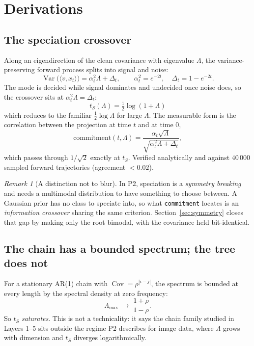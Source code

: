 \documentclass[11pt]{article}
\theoremstyle{remark}
\newtheorem{remark}{Remark}
\newcommand{\Var}{\operatorname{Var}}
\newcommand{\Cov}{\operatorname{Cov}}
\newcommand{\code}[1]{\texttt{\small #1}}
\begin{document}
\section{Derivations}
\label{sec:theory}

\subsection{The speciation crossover}
\label{sec:speciation}

Along an eigendirection of the clean covariance with eigenvalue $\Lambda$, the
variance-preserving forward process splits into signal and noise:
\begin{equation}
  \Var\bigl(\langle v, x_t\rangle\bigr) = \alpha_t^2\Lambda + \Delta_t,
  \qquad \alpha_t^2 = e^{-2t},\quad \Delta_t = 1-e^{-2t}.
\end{equation}
The mode is decided while signal dominates and undecided once noise does, so the
crossover sits at $\alpha_t^2\Lambda = \Delta_t$:
\begin{equation}
  \boxed{\;t_S(\Lambda) = \tfrac12\log(1+\Lambda)\;}
\end{equation}
which reduces to the familiar $\tfrac12\log\Lambda$ for large $\Lambda$. The
measurable form is the correlation between the projection at time $t$ and at
time $0$,
\begin{equation}
  \mathrm{commitment}(t,\Lambda)
  = \frac{\alpha_t\sqrt{\Lambda}}{\sqrt{\alpha_t^2\Lambda + \Delta_t}},
\end{equation}
which passes through $1/\sqrt2$ exactly at $t_S$. Verified analytically and
against 40\,000 sampled forward trajectories (agreement $<0.02$).

\begin{remark}[A distinction not to blur]
In P2, speciation is a \emph{symmetry breaking} and needs a multimodal
distribution to have something to choose between. A Gaussian prior has no class
to speciate into, so what \code{commitment} locates is an \emph{information
crossover} sharing the same criterion. Section~\ref{sec:symmetry} closes that
gap by making only the root bimodal, with the covariance held bit-identical.
\end{remark}

\subsection{The chain has a bounded spectrum; the tree does not}

For a stationary AR(1) chain with $\Cov = \rho^{|i-j|}$, the spectrum is bounded
at every length by the spectral density at zero frequency:
\begin{equation}
  \Lambda_{\max} \;\longrightarrow\; \frac{1+\rho}{1-\rho}.
\end{equation}
So $t_S$ \emph{saturates}. This is not a technicality: it says the chain family
studied in Layers 1--5 sits outside the regime P2 describes for image data,
where $\Lambda$ grows with dimension and $t_S$ diverges logarithmically.
\end{document}
